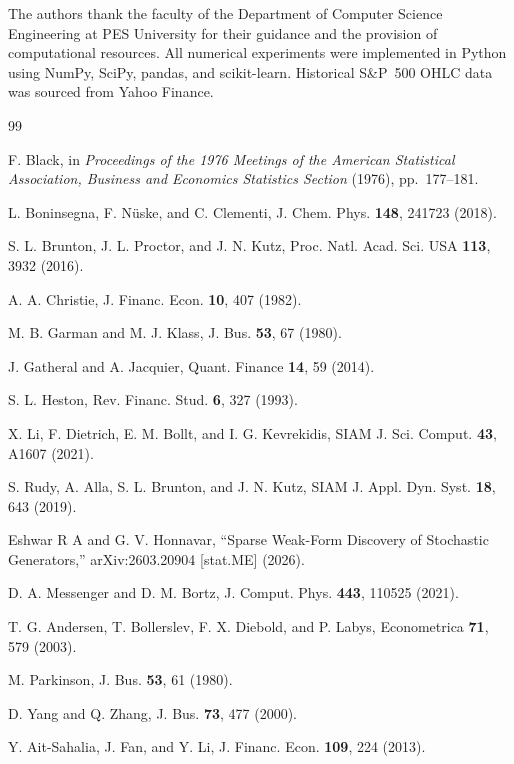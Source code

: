 \documentclass[reprint, amsmath, amssymb, aps, prl, superscriptaddress, nofootinbib]{revtex4-2}
\begin{document}
\begin{acknowledgments}
The authors thank the faculty of the Department of Computer Science Engineering
at PES University for their guidance and the provision of computational resources.
All numerical experiments were implemented in Python using NumPy, SciPy, pandas,
and scikit-learn. Historical S\&P~500 OHLC data was sourced from Yahoo Finance.
\end{acknowledgments}

\begin{thebibliography}{99}

F. Black, in \textit{Proceedings of the 1976 Meetings of the American Statistical
Association, Business and Economics Statistics Section} (1976), pp.~177--181.

L. Boninsegna, F. N\"{u}ske, and C. Clementi,
J. Chem. Phys. \textbf{148}, 241723 (2018).

S. L. Brunton, J. L. Proctor, and J. N. Kutz,
Proc. Natl. Acad. Sci. USA \textbf{113}, 3932 (2016).

A. A. Christie,
J. Financ. Econ. \textbf{10}, 407 (1982).

M. B. Garman and M. J. Klass,
J. Bus. \textbf{53}, 67 (1980).

J. Gatheral and A. Jacquier,
Quant. Finance \textbf{14}, 59 (2014).

S. L. Heston,
Rev. Financ. Stud. \textbf{6}, 327 (1993).

X. Li, F. Dietrich, E. M. Bollt, and I. G. Kevrekidis,
SIAM J. Sci. Comput. \textbf{43}, A1607 (2021).

S. Rudy, A. Alla, S. L. Brunton, and J. N. Kutz,
SIAM J. Appl. Dyn. Syst. \textbf{18}, 643 (2019).

Eshwar R A and G. V. Honnavar,
``Sparse Weak-Form Discovery of Stochastic Generators,''
arXiv:2603.20904 [stat.ME] (2026).

D. A. Messenger and D. M. Bortz,
J. Comput. Phys. \textbf{443}, 110525 (2021).


T. G. Andersen, T. Bollerslev, F. X. Diebold, and P. Labys,
Econometrica \textbf{71}, 579 (2003).

M. Parkinson,
J. Bus. \textbf{53}, 61 (1980).

D. Yang and Q. Zhang,
J. Bus. \textbf{73}, 477 (2000).


Y. Ait-Sahalia, J. Fan, and Y. Li,
J. Financ. Econ. \textbf{109}, 224 (2013).



\end{thebibliography}
\end{document}
